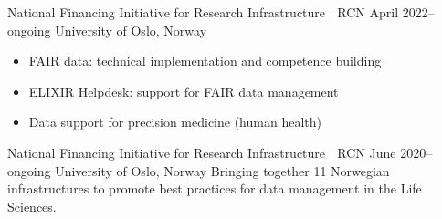 \documentclass[10pt,a4paper,ragged2e,withhyper]{altacv}
\begin{document}
\begin{paracol}{2}


\divider




\medskip
{}

        {National Financing Initiative for Research Infrastructure $\vert$ RCN}
        {April 2022--ongoing}
        {University of Oslo, Norway}
        \small{
          \begin{itemize}
          \item FAIR data: technical implementation and competence building 
          \item ELIXIR Helpdesk: support for FAIR data management
          \item Data support for precision medicine (human health)
          \end{itemize}
        }

\medskip
{}
        {National Financing Initiative for Research Infrastructure $\vert$ RCN}
        {June 2020--ongoing}
        {University of Oslo, Norway}
        \small{
          Bringing together 11 Norwegian infrastructures to promote best practices for data management in the Life Sciences.
        }
        

\end{paracol}
\end{document}

